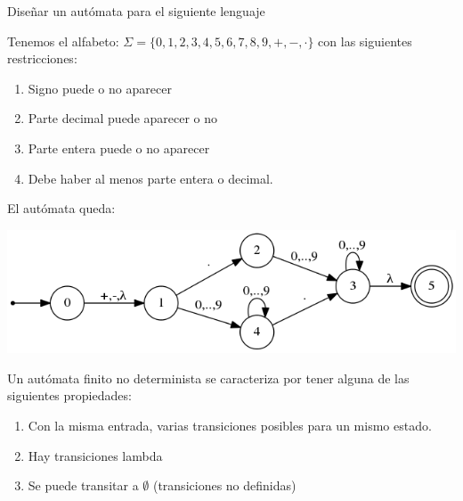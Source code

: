 \documentclass{apuntes}
\begin{document}
\begin{example}
Diseñar un autómata para el siguiente lenguaje

Tenemos el alfabeto: $\Sigma = \lbrace 0,1,2,3,4,5,6,7,8,9,+,-,\cdot \rbrace$ con las siguientes restricciones:
\begin{enumerate}
\item Signo puede o no aparecer
\item Parte decimal puede aparecer o no
\item Parte entera puede o no aparecer
\item Debe haber al menos parte entera o decimal.
\end{enumerate}

El autómata queda:
\begin{center}
\includegraphics[scale=0.75]{automata4.png}
\end{center}
\end{example}

\newpage

\begin{defn}
Un autómata finito no determinista se caracteriza por tener alguna de las siguientes propiedades:
\begin{enumerate}
\item Con la misma entrada, varias transiciones posibles para un mismo estado.
\item Hay transiciones lambda
\item Se puede transitar a $\emptyset$ (transiciones no definidas)
\end{enumerate}
\end{defn}
\end{document}
